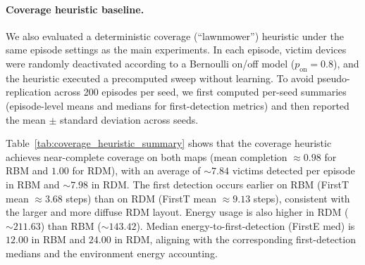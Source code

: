 \documentclass[drones,article,accept,pdftex,moreauthors]{Definitions/mdpi}
\begin{document}
\paragraph{Coverage heuristic baseline.}
We also evaluated a deterministic coverage (“lawnmower”) heuristic under the same
episode settings as the main experiments. In each episode, victim devices were
randomly deactivated according to a Bernoulli on/off model ($p_{\text{on}}=0.8$), and
the heuristic executed a precomputed sweep without learning. To avoid
pseudo-replication across 200 episodes per seed, we first computed per-seed summaries
(episode-level means and medians for first-detection metrics) and then reported the
mean $\pm$ standard deviation across seeds.

Table~\ref{tab:coverage_heuristic_summary} shows that the coverage heuristic achieves
near-complete coverage on both maps (mean completion $\approx 0.98$ for RBM and $1.00$
for RDM), with an average of $\sim 7.84$ victims detected per episode in RBM and
$\sim 7.98$ in RDM. The first detection occurs earlier on RBM (FirstT mean
$\approx 3.68$ steps) than on RDM (FirstT mean $\approx 9.13$ steps), consistent with
the larger and more diffuse RDM layout. Energy usage is also higher in RDM
($\sim 211.63$) than RBM ($\sim 143.42$). Median energy-to-first-detection
(FirstE med) is $12.00$ in RBM and $24.00$ in RDM, aligning with the corresponding
first-detection medians and the environment energy accounting.
\end{document}

